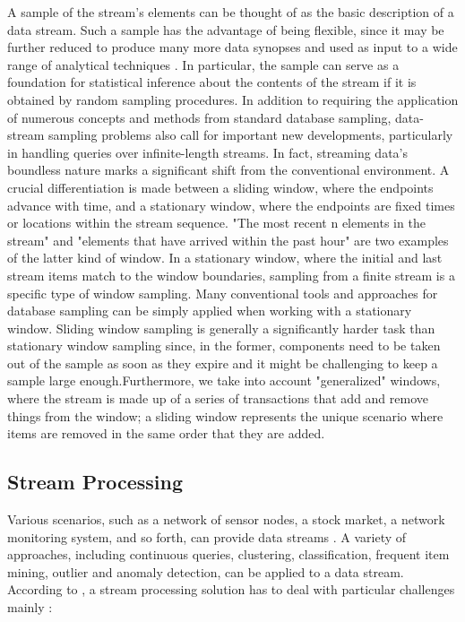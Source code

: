 A sample of the stream's elements can be thought of as the basic description of a data stream. Such a sample has the advantage of being flexible, since it may be further reduced to produce many more data synopses and used as input to a wide range of analytical techniques \cite{garofalakis2016data}. In particular, the sample can serve as a foundation for statistical inference about the contents of the stream if it is obtained by random sampling procedures. In addition to requiring the application of numerous concepts and methods from standard database sampling, data-stream sampling problems also call for important new developments, particularly in handling queries over infinite-length streams. In fact, streaming data's boundless nature marks a significant shift from the conventional environment.  A crucial differentiation is made between a sliding window, where the endpoints advance with time, and a stationary window, where the endpoints are fixed times or locations within the stream sequence. "The most recent n elements in the stream" and "elements that have arrived within the past hour" are two examples of the latter kind of window. In a stationary window, where the initial and last stream items match to the window boundaries, sampling from a finite stream is a specific type of window sampling. Many conventional tools and approaches for database sampling can be simply applied when working with a stationary window. Sliding window sampling is generally a significantly harder task than stationary window sampling since, in the former, components need to be taken out of the sample as soon as they expire and it might be challenging to keep a sample large enough.Furthermore, we take into account "generalized" windows, where the stream is made up of a series of transactions that add and remove things from the window; a sliding window represents the unique scenario where items are removed in the same order that they are added.

\subsection{Stream Processing}

Various scenarios, such as a network of sensor nodes, a stock market, a network monitoring system, and so forth, can provide data streams \cite{namiot2015big}. A variety of approaches, including continuous queries, clustering, classification, frequent item mining, outlier and anomaly detection, can be applied to a data stream. According to \cite{Wähner_2014}, a stream processing solution has to deal with particular challenges mainly  :

